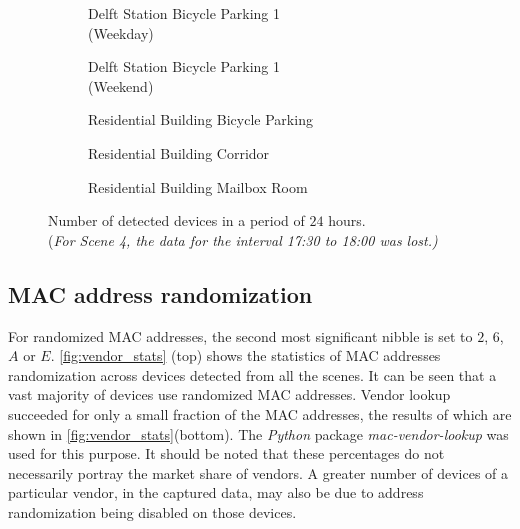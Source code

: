 \begin{figure*}[h!]
    \centering
    \captionsetup[subfigure]{justification=centering}
    \captionsetup{justification=centering}
    \begin{subfigure}{0.48\textwidth}
        
        \caption{Delft Station Bicycle Parking 1\\(Weekday)}
        \vspace*{5mm}
    \end{subfigure}\hfill%
    \begin{subfigure}{0.48\textwidth}
        
        \caption{Delft Station Bicycle Parking 1\\(Weekend)}
        \vspace*{5mm}
    \end{subfigure}
    \begin{subfigure}{0.48\textwidth}
        
        \caption{Residential Building Bicycle Parking}
        \vspace*{5mm}
    \end{subfigure}\hfill%
    \begin{subfigure}{0.48\textwidth}
        
        \caption{Residential Building Corridor}
        \vspace*{5mm}
    \end{subfigure}
    \begin{subfigure}{0.48\textwidth}
        
        \caption{Residential Building Mailbox Room}
        \vspace*{5mm}
    \end{subfigure}
    \caption{Number of detected devices in a period of $24$ hours.\\(\textit{For Scene 4, the data for the interval 17:30 to 18:00 was lost.)}}
    \label{fig:actv}
\end{figure*}

\subsection{MAC address randomization}

For randomized MAC addresses, the second most significant nibble is set to $2$, $6$, $A$ or $E$.\cite{purvis_get_2020} \autoref{fig:vendor_stats} (top) shows the statistics of MAC addresses randomization across devices detected from all the scenes. It can be seen that a vast majority of devices use randomized MAC addresses. Vendor lookup succeeded for only a small fraction of the MAC addresses, the results of which are shown in \autoref{fig:vendor_stats}(bottom). The \textit{Python} package \textit{mac-vendor-lookup} was used for this purpose. It should be noted that these percentages do not necessarily portray the market share of vendors. A greater number of devices of a particular vendor, in the captured data, may also be due to address randomization being disabled on those devices.

